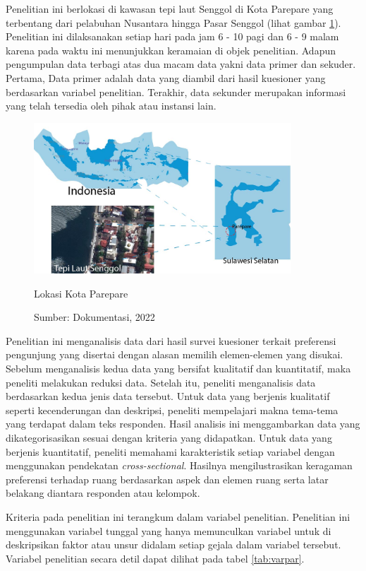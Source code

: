 \documentclass[11pt]{simartadv} %
\begin{document}
Penelitian ini berlokasi di kawasan tepi laut Senggol di Kota Parepare yang terbentang dari pelabuhan Nusantara hingga Pasar Senggol (lihat gambar \ref{fig:lokzi}). Penelitian ini dilaksanakan setiap hari pada jam 6 - 10 pagi dan 6 - 9 malam karena pada waktu ini menunjukkan keramaian di objek penelitian. Adapun pengumpulan data terbagi atas dua macam data yakni data primer dan sekuder. Pertama, Data primer adalah data yang diambil dari hasil kuesioner yang berdasarkan variabel penelitian. Terakhir, data sekunder merupakan informasi yang telah tersedia oleh pihak atau instansi lain.

\begin{figure}[htpb]
    \centering
    \includegraphics[width=0.86\textwidth]{figures/lokzi}
    \caption{Lokasi Kota Parepare}
    \caption*{Sumber: Dokumentasi, 2022}
    \label{fig:lokzi}
\end{figure}

Penelitian ini menganalisis data dari hasil survei kuesioner terkait preferensi pengunjung yang disertai dengan alasan memilih elemen-elemen yang disukai. Sebelum menganalisis kedua data yang bersifat kualitatif dan kuantitatif, maka peneliti melakukan reduksi data. Setelah itu, peneliti menganalisis data berdasarkan kedua jenis data tersebut.
Untuk data yang berjenis kualitatif seperti kecenderungan dan deskripsi, peneliti mempelajari makna tema-tema yang terdapat dalam teks responden.
Hasil analisis ini menggambarkan data yang dikategorisasikan sesuai dengan kriteria yang didapatkan.
Untuk data yang berjenis kuantitatif, peneliti memahami karakteristik setiap variabel dengan menggunakan pendekatan \textit{cross-sectional}. Hasilnya mengilustrasikan keragaman preferensi terhadap ruang berdasarkan aspek dan elemen ruang serta latar belakang diantara responden atau kelompok.

Kriteria pada penelitian ini terangkum dalam variabel penelitian. Penelitian ini menggunakan variabel tunggal yang hanya memunculkan variabel untuk di deskripsikan faktor atau unsur didalam setiap gejala dalam variabel tersebut. Variabel penelitian secara detil dapat dilihat pada tabel \ref {tab:varpar}.
\newpage
\end{document}
